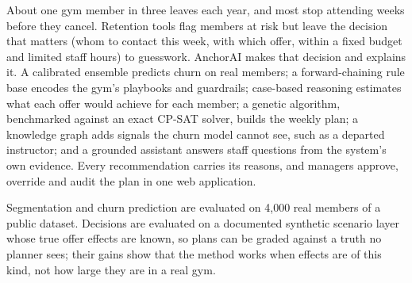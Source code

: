 
About one gym member in three leaves each year, and most stop attending weeks before they cancel. Retention tools flag members at risk but leave the decision that matters (whom to contact this week, with which offer, within a fixed budget and limited staff hours) to guesswork. AnchorAI makes that decision and explains it. A calibrated ensemble predicts churn on real members; a forward-chaining rule base encodes the gym's playbooks and guardrails; case-based reasoning estimates what each offer would achieve for each member; a genetic algorithm, benchmarked against an exact CP-SAT solver, builds the weekly plan; a knowledge graph adds signals the churn model cannot see, such as a departed instructor; and a grounded assistant answers staff questions from the system's own evidence. Every recommendation carries its reasons, and managers approve, override and audit the plan in one web application.

Segmentation and churn prediction are evaluated on 4,000 real members of a public dataset. Decisions are evaluated on a documented synthetic scenario layer whose true offer effects are known, so plans can be graded against a truth no planner sees; their gains show that the method works when effects are of this kind, not how large they are in a real gym.

\vspace{1.2\baselineskip}
\noindent
{}\hfill
{}\hfill
{}\hfill
{}

\vspace{1.4\baselineskip}

\vspace{0.6\baselineskip}
\projectlinks
\clearpage
